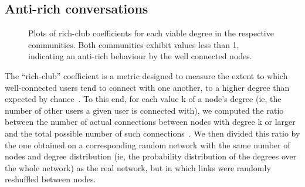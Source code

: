 \subsection{Anti-rich conversations}
\label{sec:richclub}
\begin{figure}[!ht]
    \centering
    \caption{ Plots of rich-club coefficients for each viable degree in the respective communities. Both communities exhibit values less than 1, indicating an anti-rich behaviour by the well connected nodes.  }
\end{figure}
The “rich-club” coefficient is a metric designed to measure the extent to which well-connected users tend to connect with one another, to a higher degree than expected by chance~\cite{colizza2006detecting}. To this end, for each value k of a node’s degree (ie, the number of other users a given user is connected with), we computed the ratio between the number of actual connections between nodes with degree k or larger and the total possible number of such connections~\cite{opsahl2008prominence}. We then divided this ratio by the one obtained on a corresponding random network with the same number of nodes and degree distribution (ie, the probability distribution of the degrees over the whole network) as the real network, but in which links were randomly reshuffled between nodes. 

